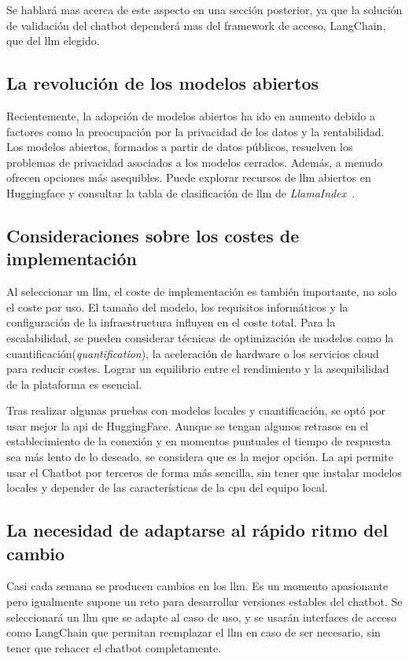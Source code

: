Se hablará mas acerca de este aspecto en una sección posterior, ya que la solución de validación del chatbot dependerá mas del framework de acceso, LangChain, que del \acrshort{llm} elegido.

\subsection{La revolución de los modelos abiertos}
Recientemente, la adopción de modelos abiertos ha ido en aumento debido a factores como la preocupación por la privacidad de los datos y la rentabilidad. Los modelos abiertos, formados a partir de datos públicos, resuelven los problemas de privacidad asociados a los modelos cerrados. Además, a menudo ofrecen opciones más asequibles. Puede explorar recursos de \acrshort{llm} abiertos en Huggingface y consultar la tabla de clasificación de \acrshort{llm} de \textit{LlamaIndex}~\cite{LlamaIndex}.

\subsection{Consideraciones sobre los costes de implementación}
Al seleccionar un \acrshort{llm}, el coste de implementación es también importante, no solo el coste por uso. El tamaño del modelo, los requisitos informáticos y la configuración de la infraestructura influyen en el coste total. Para la escalabilidad, se pueden considerar técnicas de optimización de modelos como la cuantificación(\textit{quantification}), la aceleración de hardware o los servicios cloud para reducir costes. Lograr un equilibrio entre el rendimiento y la asequibilidad de la plataforma es esencial.

Tras realizar algunas pruebas con modelos locales y cuantificación, se optó por usar mejor la \acrshort{api} de HuggingFace. Aunque se tengan algunos retrasos en el establecimiento de la conexión y en momentos puntuales el tiempo de respuesta sea más lento de lo deseado, se considera que es la mejor opción. La \acrshort{api} permite usar el Chatbot por terceros de forma más sencilla, sin tener que instalar modelos locales y depender de las características de la \acrshort{cpu} del equipo local.

\subsection{La necesidad de adaptarse al rápido ritmo del cambio}
Casi cada semana se producen cambios en los \acrshort{llm}. Es un momento apasionante pero igualmente supone un reto para desarrollar versiones estables del chatbot. Se seleccionará un \acrshort{llm} que se adapte al caso de uso, y se usarán interfaces de acceso como LangChain que permitan reemplazar el \acrshort{llm} en caso de ser necesario, sin tener que rehacer el chatbot completamente.

